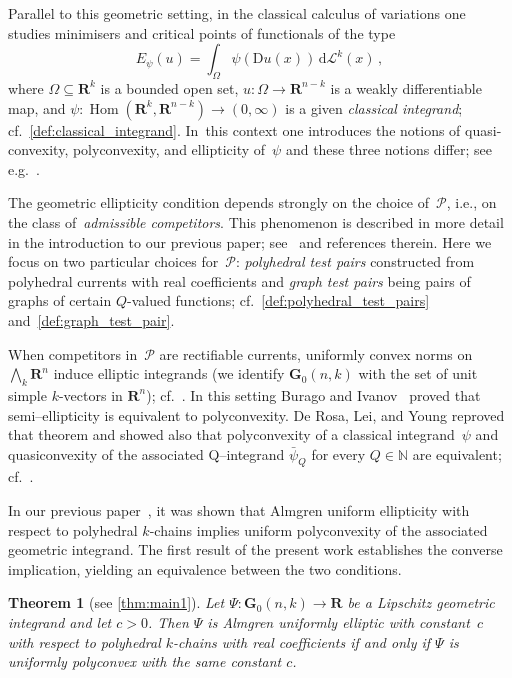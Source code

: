 \documentclass[a4paper,twoside,reqno]{article}
\theoremstyle{definition}
\theoremstyle{remark}
\theoremstyle{plain}
\newtheorem*{theorem*}{Theorem}
\theoremstyle{remark}
\theoremstyle{definition}
\newcommand{\ograss}[2]{\mathbf{G}_0(#1,#2)}
\renewcommand{\textint}[2]{{\textstyle\int_{#1}^{#2}}}
\newcommand{\textint}[2]{{\textstyle\int_{#1}^{#2}}}
\newcommand{\natp}{\mathbb{N}}
\newcommand{\R}{\mathbf{R}}
\newcommand{\LM}{\mathscr{L}}
\newcommand{\ud}{\ensuremath{\,\mathrm{d}}}
\newcommand{\uD}{\ensuremath{\mathrm{D}}}
\newcommand{\tbwedge}{{\textstyle \boldsymbol{\bigwedge}}}
\DeclareMathOperator{\Hom}{Hom}
\begin{document}
Parallel to this geometric setting, in the classical calculus of variations one
studies minimisers and critical points of functionals of the type
\begin{displaymath}
    E_{\psi}(u) = \textint{\Omega}{} \psi(\uD u(x)) \ud \LM^k(x) \,,
\end{displaymath}
where $\Omega \subseteq \R^k$ is a bounded open set, $u : \Omega \to \R^{n-k}$
is a weakly differentiable map, and $\psi : \Hom(\R^k,\R^{n-k}) \to (0,\infty)$
is a given \emph{classical integrand}; cf.~\ref{def:classical_integrand}.
In~this context one introduces the notions of quasi-convexity, polyconvexity,
and ellipticity of~$\psi$ %
and these three notions differ; see e.g.~\cite[Chapter~5]{Dacorogna2008}.

The geometric ellipticity condition depends strongly on the choice of~$\mathcal{P}$,
i.e., on the class of~\emph{admissible competitors}. This phenomenon is
described in more detail in the introduction to our previous paper;
see~\cite{Lesniak_2025} and references therein. Here we focus on two particular
choices for~$\mathcal{P}$: \emph{polyhedral test pairs} constructed from
polyhedral currents with real coefficients and \emph{graph test pairs} being
pairs of graphs of certain $Q$-valued functions;
cf.~\ref{def:polyhedral_test_pairs} and~\ref{def:graph_test_pair}.

When competitors in~$\mathcal{P}$ are rectifiable currents, uniformly convex
norms on~$\tbwedge_k\R^n$ induce elliptic integrands (we identify $\ograss nk$
with the set of unit simple $k$-vectors in $\R^n$);
cf.~\cite[5.1.2]{Federer1969}. In this setting Burago and
Ivanov~\cite{Burago2004} proved that semi--ellipticity is equivalent to
polyconvexity. De Rosa, Lei, and Young reproved that theorem
and showed also that polyconvexity of a classical integrand~$\psi$ and
quasiconvexity of the associated Q–integrand $\bar{\psi}_Q$ for every
$Q \in \natp$ are equivalent; cf.~\cite{Rosa2023}.

In our previous paper~\cite[Theorem~5.10]{Lesniak_2025}, it was shown that
Almgren uniform ellipticity with respect to polyhedral $k$-chains implies
uniform polyconvexity of the associated geometric integrand. The first result of
the present work establishes the converse implication, yielding an equivalence
between the two conditions.

\begin{theorem*}[see \ref{thm:main1}]
    Let $\Psi : \ograss{n}{k} \to \R$ be a Lipschitz geometric integrand and let
    $c>0$. Then $\Psi$ is Almgren uniformly elliptic with constant~$c$ with
    respect to polyhedral $k$-chains with real coefficients if and only if
    $\Psi$ is uniformly polyconvex with the same constant $c$.
\end{theorem*}
\end{document}
